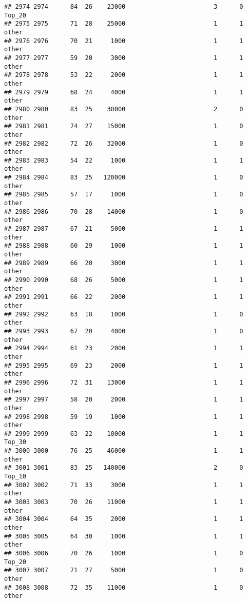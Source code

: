 \documentclass[
]{article}
\begin{document}
\begin{verbatim}
## 2974 2974      84  26    23000                        3      0   Top_20
## 2975 2975      71  28    25000                        1      1    other
## 2976 2976      70  21     1000                        1      1    other
## 2977 2977      59  20     3000                        1      1    other
## 2978 2978      53  22     2000                        1      1    other
## 2979 2979      68  24     4000                        1      1    other
## 2980 2980      83  25    38000                        2      0    other
## 2981 2981      74  27    15000                        1      0    other
## 2982 2982      72  26    32000                        1      0    other
## 2983 2983      54  22     1000                        1      1    other
## 2984 2984      83  25   120000                        1      0    other
## 2985 2985      57  17     1000                        1      0    other
## 2986 2986      70  28    14000                        1      0    other
## 2987 2987      67  21     5000                        1      1    other
## 2988 2988      60  29     1000                        1      1    other
## 2989 2989      66  20     3000                        1      1    other
## 2990 2990      68  26     5000                        1      1    other
## 2991 2991      66  22     2000                        1      1    other
## 2992 2992      63  18     1000                        1      0    other
## 2993 2993      67  20     4000                        1      0    other
## 2994 2994      61  23     2000                        1      1    other
## 2995 2995      69  23     2000                        1      1    other
## 2996 2996      72  31    13000                        1      1    other
## 2997 2997      58  20     2000                        1      1    other
## 2998 2998      59  19     1000                        1      1    other
## 2999 2999      63  22    10000                        1      1   Top_30
## 3000 3000      76  25    46000                        1      1    other
## 3001 3001      83  25   140000                        2      0   Top_10
## 3002 3002      71  33     3000                        1      1    other
## 3003 3003      70  26    11000                        1      1    other
## 3004 3004      64  35     2000                        1      1    other
## 3005 3005      64  30     1000                        1      1    other
## 3006 3006      70  26     1000                        1      0   Top_20
## 3007 3007      71  27     5000                        1      0    other
## 3008 3008      72  35    11000                        1      0    other

\end{verbatim}
\end{document}
